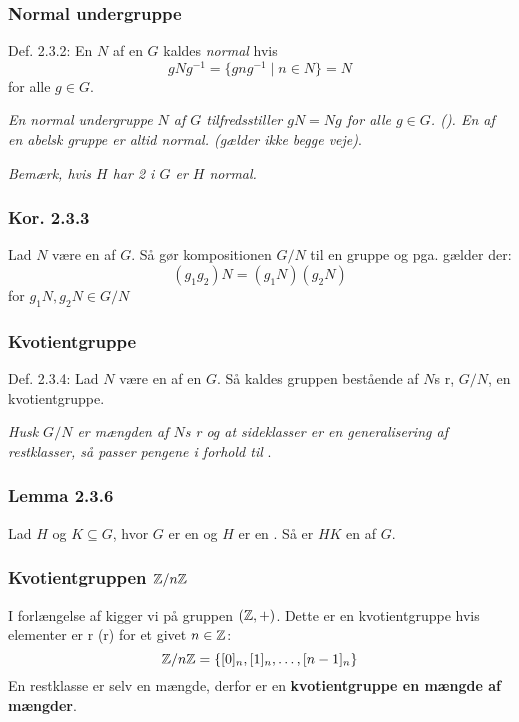 \subsubsection{Normal undergruppe}
\label{Normal undergruppe}
Def. 2.3.2: En  $N$ af en  $G$ kaldes
\textit{normal} hvis
\begin{equation*}
  gNg^{-1} = \{gng^{-1} \mid n \in N\} = N
\end{equation*}
for alle $g \in G$.

\textit{En normal undergruppe $N$ af $G$ tilfredsstiller $gN = Ng$ for
alle $g \in G$. (). En  af en abelsk gruppe
er altid normal. (gælder ikke begge veje)}.

\textit{Bemærk, hvis $H$ har  2 i $G$ er $H$ normal.}

\subsubsection{Kor. 2.3.3}
Lad $N$ være en  af  $G$. Så gør
kompositionen  $G/N$ til en gruppe og pga.
 gælder der:
\begin{equation*}
  (g_1 g_2) N = (g_1 N)(g_2 N) 
\end{equation*}
for $g_1 N, g_2 N \in G/N$

\subsubsection{Kvotientgruppe}
\label{Kvotientgruppe}
Def. 2.3.4: Lad $N$ være en  af en 
$G$. Så kaldes gruppen bestående af $N$s r, $G/N$, en
kvotientgruppe.

\textit{Husk $G/N$ er mængden af $N$s r og at sideklasser er
en generalisering af restklasser, så passer pengene i forhold til
}.

\subsubsection{Lemma 2.3.6}
Lad $H$ og $K \subseteq G$, hvor $G$ er en  og $H$ er en
. Så er $HK$ en  af $G$.

\subsubsection{Kvotientgruppen $\mathbb{Z}/n\mathbb{Z}$}
\label{Kvotientgruppe_Z}
I forlængelse af  kigger vi på gruppen $(\mathbb{Z}, +)$. Dette
er en kvotientgruppe hvis elementer er r
(r) for et givet $n \in \mathbb{Z}$:
\begin{equation*}
  \mathbb{Z}/n\mathbb{Z} = \{ [0]_n,[1]_n,\ldots,[n-1]_n \}
\end{equation*}
En restklasse er selv en mængde, derfor er en \textbf{kvotientgruppe en mængde
af mængder}.


